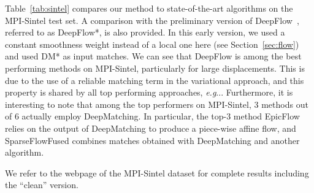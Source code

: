 \documentclass[twocolumn,natbib]{svjour3}
\makeatletter
\DeclareRobustCommand\onedot{\futurelet\@let@token\@onedot}
\def\@onedot{\ifx\@let@token.\else.\null\fi\xspace}
\def\eg{\emph{e.g}\onedot} \def\Eg{\emph{E.g}\onedot}
\makeatother
\begin{document}
Table~\ref{tab:sintel} compares our method to state-of-the-art algorithms
on the MPI-Sintel test set.
A comparison with the preliminary version of DeepFlow~\citep{DeepFlow}, 
referred to as DeepFlow*, is also provided. In this early version, we
used a constant smoothness weight instead of a local one here (see
Section~\ref{sec:flow}) and used DM* as input matches. 
We can see that DeepFlow is among the best performing
methods on MPI-Sintel, particularly for large displacements. 
This is due to the use of a reliable matching term in the variational approach,
and this property is shared by all top performing approaches, \eg \citep{epicflow, Leordeanu2013}.
Furthermore, it is interesting to note that among the top performers on
MPI-Sintel, 3 methods out of 6 actually employ DeepMatching. In particular, 
the top-3 method EpicFlow~\citep{epicflow} relies on the
output of DeepMatching to produce a piece-wise affine flow,
and SparseFlowFused \citep{sparseflowfused} combines matches obtained with DeepMatching and another algorithm.

We refer to the webpage of the MPI-Sintel dataset for complete results including the ``clean'' version. 
\end{document}
